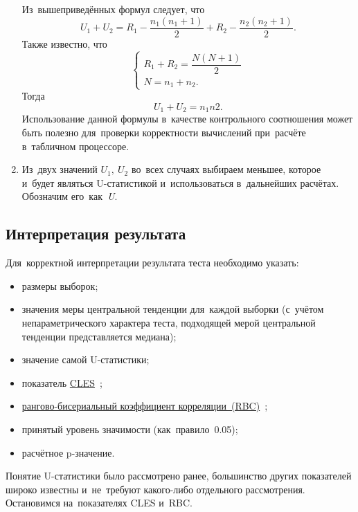 \documentclass[]{scrreprt}
\begin{document}
\begin{enumerate}
	Из~вышеприведённых формул следует, что
	\begin{equation}\label{eq:U1-U2-relation}
	U_{1}+U_{2} = R_{1}-\frac{n_{1}(n_{1}+1)}{2} + R_{2}-\frac{n_{2}(n_{2}+1)}{2}.
	\end{equation}
	Также известно, что
	\begin{equation}\label{eq:R-N-relation}
	\begin{cases}
	R_{1}+R_{2}=\dfrac{N(N+1)}{2}\\
	N=n_{1}+n_{2}.
	\end{cases}
	\end{equation}
	Тогда
	\begin{equation}\label{eq:check-U-value}
	U_{1}+U_{2}=n_{1}n{2}.
	\end{equation}
	Использование данной формулы в~качестве контрольного соотношения может быть полезно для~проверки корректности вычислений при~расчёте в~табличном процессоре.
	\item Из~двух значений ${\textstyle U_{1},\ U_{2}}$ во~всех случаях выбираем меньшее, которое и~будет являться U-статистикой и~использоваться в~дальнейших расчётах. Обозначим его~как~\textit{U}.
\end{enumerate}
\subsection{Интерпретация результата}
Для~корректной интерпретации результата теста необходимо указать:
\begin{itemize}
	\item размеры выборок;
	\item значения меры центральной тенденции для~каждой выборки (с~учётом непараметрического характера теста, подходящей мерой центральной тенденции представляется медиана);
	\item значение самой U-статистики;
	\item показатель \href{https://en.wikipedia.org/wiki/Effect_size#Common_language_effect_size}{CLES}~\cite{Wiki:CLES};
	\item \href{https://en.wikipedia.org/wiki/Effect_size#Rank-biserial_correlation}{рангово-бисериальный коэффициент корреляции~(RBC)}~\cite{Wiki:rank-biserial-correlation};
	\item принятый уровень значимости (как~правило~0.05);
	\item расчётное p-значение.
\end{itemize}
Понятие U-статистики было рассмотрено ранее, большинство других показателей широко известны и~не~требуют какого-либо отдельного рассмотрения. Остановимся на~показателях CLES и~RBC.
\end{document}
